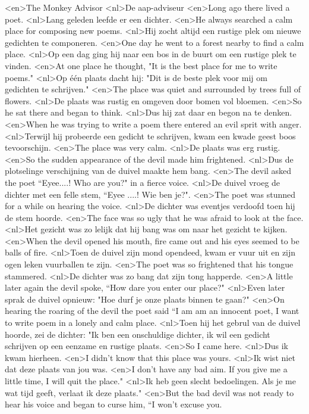 <en>The Monkey Advisor
<nl>De aap-adviseur
<en>Long ago there lived a poet.
<nl>Lang geleden leefde er een dichter.
<en>He always searched a calm place for composing new poems.
<nl>Hij zocht altijd een rustige plek om nieuwe gedichten te  componeren.
<en>One day he went to a forest nearby to find a calm place.
<nl>Op een dag ging hij naar een bos in de buurt om een rustige plek te vinden.
<en>At one place he thought, "It is the best place for me to write poems."
<nl>Op één plaats dacht hij: "Dit is de beste plek voor mij om gedichten te schrijven."
<en>The place was quiet and surrounded by trees full of flowers.
<nl>De plaats was rustig en omgeven door bomen vol bloemen.
<en>So he sat there and began to think.
<nl>Dus hij zat daar en begon na te denken.
<en>When he was trying to write a poem there entered an evil sprit with anger.
<nl>Terwijl hij probeerde een gedicht te schrijven, kwam een kwade geest boos tevoorschijn.
<en>The place was very calm.
<nl>De plaats was erg rustig.
<en>So the sudden appearance of the devil made him frightened.
<nl>Dus de plotselinge verschijning van de duivel maakte hem bang.
<en>The devil asked the poet “Eyee....! Who are you?" in a fierce voice.
<nl>De duivel vroeg de dichter met een felle stem, “Eyee ....! Wie ben je?".
<en>The poet was stunned for a while on hearing the voice.
<nl>De dichter was eventjes verdoofd toen hij de stem hoorde.
<en>The face was so ugly that he was afraid to look at the face.
<nl>Het gezicht was zo lelijk dat hij bang was om naar het gezicht te kijken.
<en>When the devil opened his mouth, fire came out and his eyes seemed to be balls of fire.
<nl>Toen de duivel zijn mond opendeed, kwam er vuur uit en zijn ogen leken vuurballen te zijn.
<en>The poet was so frightened that his tongue stammered.
<nl>De dichter was zo bang dat zijn tong happerde.
<en>A little later again the devil spoke, “How dare you enter our place?"
<nl>Even later sprak de duivel opnieuw: "Hoe durf je onze plaats binnen te gaan?"
<en>On hearing the roaring of the devil the poet said “I am am an innocent poet, I want to write poem in a lonely and calm place.
<nl>Toen hij het gebrul van de duivel hoorde, zei de dichter: "Ik ben een onschuldige dichter, ik wil een gedicht schrijven op een eenzame en rustige plaats.
<en>So I came here.
<nl>Dus ik kwam hierheen.
<en>I didn’t know that this place was yours.
<nl>Ik wist niet dat deze plaats van jou was.
<en>I don’t have any bad aim. If you give me a little time, I will quit the place."
<nl>Ik heb geen slecht bedoelingen. Als je me wat tijd geeft, verlaat  ik deze plaats."
<en>But the bad devil was not ready to hear his voice and began to curse him, “I won’t excuse you.
